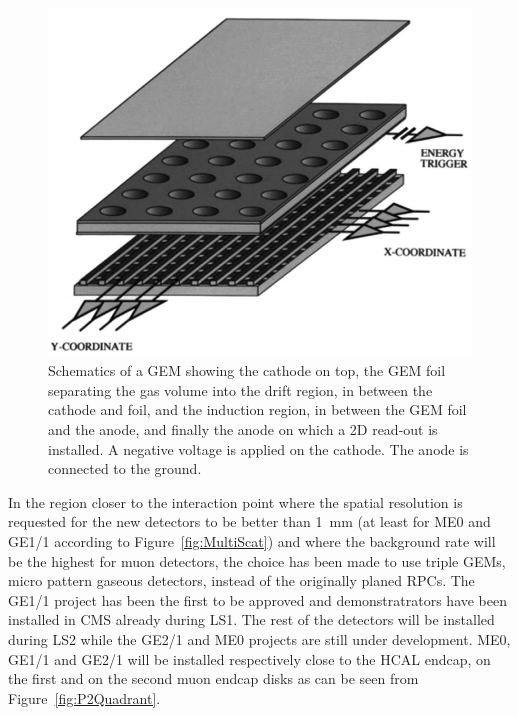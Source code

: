 \begingroup\setlength{\intextsep}{5pt}\setlength{\columnsep}{15pt}

	\begin{figure}
		\vspace{-5mm}
		\centering
		\includegraphics[width=0.9\linewidth]{fig/chapt3/GEM.png}
		\caption{\label{fig:GEM} Schematics of a GEM showing the cathode on top, the GEM foil separating the gas volume into the drift region, in between the cathode and foil, and the induction region, in between the GEM foil and the anode, and finally the anode on which a 2D read-out is installed. A negative voltage is applied on the cathode. The anode is connected to the ground.}
	\end{figure}
	
	In the region closer to the interaction point where the spatial resolution is requested for the new detectors to be better than \SI{1}{mm} (at least for ME0 and GE1/1 according to Figure~\ref{fig:MultiScat}) and where the background rate will be the highest for muon detectors, the choice has been made to use triple GEMs, micro pattern gaseous detectors, instead of the originally planed RPCs. The GE1/1 project has been the first to be approved and demonstratrators have been installed in CMS already during LS1. The rest of the detectors will be installed during LS2 while the GE2/1 and ME0 projects are still under development. ME0, GE1/1 and GE2/1 will be installed respectively close to the HCAL endcap, on the first and on the second muon endcap disks as can be seen from Figure~\ref{fig:P2Quadrant}.
	
\endgroup

